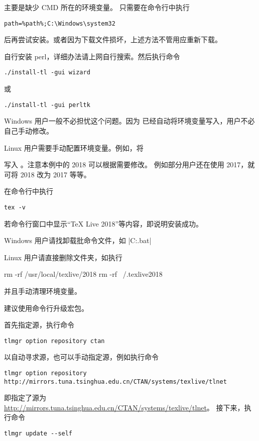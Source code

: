 主要是缺少 CMD 所在的环境变量。 只需要在命令行中执行
\begin{verbatim}
path=%path%;C:\Windows\system32
\end{verbatim}
后再尝试安装。或者因为下载文件损坏，上述方法不管用应重新下载。



自行安装 perl，详细办法请上网自行搜索。然后执行命令
\begin{verbatim}
./install-tl -gui wizard
\end{verbatim}
或
\begin{verbatim}
./install-tl -gui perltk
\end{verbatim}



Windows 用户一般不必担忧这个问题。因为 \TeXLive{} 已经自动将环境变量写入，用户不必自己手动修改。

Linux 用户需要手动配置环境变量。例如，将
写入 。注意本例中的 2018 可以根据需要修改。
例如部分用户还在使用 \TeXLive{} 2017，就可将 2018 改为 2017 等等。



在命令行中执行
\begin{verbatim}
tex -v
\end{verbatim}
若命令行窗口中显示“TeX Live 2018”等内容，即说明安装成功。



Windows 用户请找卸载批命令文件，如 |C:\texlive{}\tlpkg\installer\uninst.bat|

Linux 用户请直接删除文件夹，如执行
\begin{shcode}
  rm -rf /usr/local/texlive/2018
  rm -rf ~/.texlive2018
\end{shcode}
并且手动清理环境变量。


建议使用命令行升级宏包。

首先指定源，执行命令
\begin{verbatim}
tlmgr option repository ctan
\end{verbatim}
以自动寻求源，也可以手动指定源，例如执行命令
\begin{verbatim}
tlmgr option repository http://mirrors.tuna.tsinghua.edu.cn/CTAN/systems/texlive/tlnet
\end{verbatim}
即指定了源为 \url{http://mirrors.tuna.tsinghua.edu.cn/CTAN/systems/texlive/tlnet}。
接下来，执行命令
\begin{verbatim}
tlmgr update --self
\end{verbatim}


